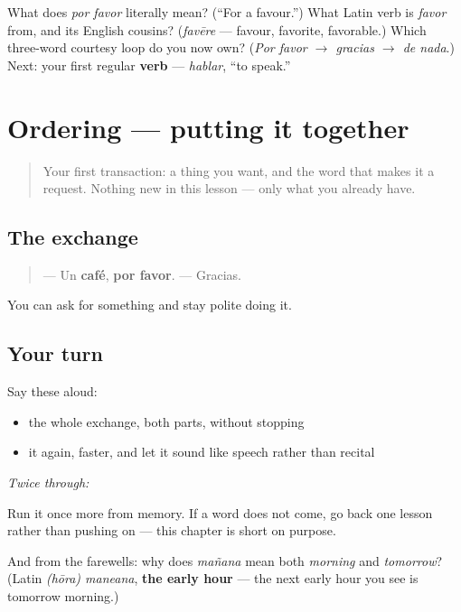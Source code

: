 \begin{tcolorbox}[breakable,colback=teal!4,colframe=teal!35!black,title={Before you move on}]
What does \emph{por favor} literally mean? (\textquotedblleft{}For a favour.\textquotedblright{}) What Latin verb is \emph{favor} from, and its English cousins? (\emph{favēre} — favour, favorite, favorable.) Which three-word courtesy loop do you now own? (\emph{Por favor $\to$ gracias $\to$ de nada}.) Next: your first regular \textbf{verb} — \emph{hablar}, “to speak.”
\end{tcolorbox}
\section[Practice]{Ordering — putting it together}

\label{lesson:ES-C06-repaso-cafe}



\begin{quote}
Your first transaction: a thing you want, and the word that makes it a request. Nothing new in this lesson — only what you already have.
\end{quote}

\subsection*{The exchange}
\begin{quote}
— Un \textbf{café}, \textbf{por favor}. — Gracias.
\end{quote}

\begin{grammarlens}[title={What you've built}]
You can ask for something and stay polite doing it.
\end{grammarlens}

\subsection*{Your turn}
Say these aloud:

\begin{itemize}
\raggedright
  \item the whole exchange, both parts, without stopping
  \item it again, faster, and let it sound like speech rather than recital
\end{itemize}

\emph{Twice through:}

\begin{tcolorbox}[breakable,colback=teal!4,colframe=teal!35!black,title={Before you move on}]
Run it once more from memory. If a word does not come, go back one lesson rather than pushing on — this chapter is short on purpose.

And from the farewells: why does \emph{mañana} mean both \emph{morning} and \emph{tomorrow}? (Latin \emph{(hōra) maneana}, \textbf{the early hour} — the next early hour you see is tomorrow morning.)
\end{tcolorbox}
